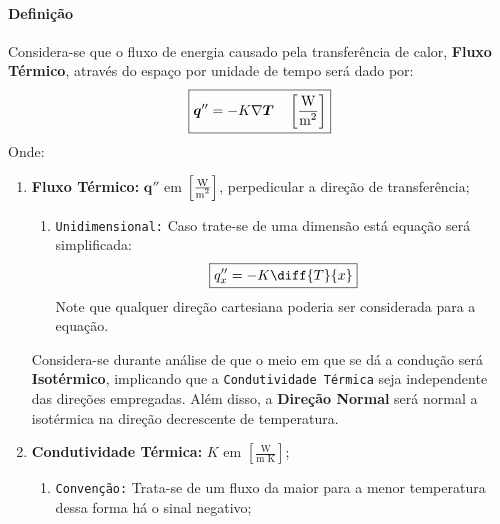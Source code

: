 \documentclass{article}
\begin{document}
            \paragraph{Definição}Considera-se que o fluxo de energia causado pela transferência de calor, \textbf{Fluxo Térmico}, através do espaço por unidade de tempo será dado por:
                \begin{equation}
                    \boxed{
                        \boldsymbol{q}'' = - K \nabla \boldsymbol{T} 
                        \quad 
                        \left[\frac{\text{W}}{\text{m\textsuperscript{2}}}\right]
                    }\label{eq.Fourier}
                \end{equation}
            Onde:
                \begin{enumerate}[rightmargin = \leftmargin]
                    \item \textbf{Fluxo Térmico:} $\boldsymbol{q}''$ em $\left[\frac{\text{W}}{\text{m\textsuperscript{2}}}\right]$, perpedicular a direção de transferência;
                        \begin{enumerate}[noitemsep]
                            \item \texttt{Unidimensional:} Caso trate-se de uma dimensão está equação será simplificada:
                                \begin{equation*}
                                    \boxed{
                                        q_{x}'' = - K \diff{T}{x}
                                    }
                                \end{equation*}
                            Note que qualquer direção cartesiana poderia ser considerada para a equação.
                        \end{enumerate}
                    Considera-se durante análise de que o meio em que se dá a condução será \textbf{Isotérmico}, implicando que a \texttt{Condutividade Térmica} seja independente das direções empregadas. Além disso, a \textbf{Direção Normal} será normal a isotérmica na direção decrescente de temperatura.

                    \item \textbf{Condutividade Térmica:} $K$ em $\left[\frac{\text{W}}{\text{m K}}\right]$;
                        \begin{enumerate}[noitemsep, rightmargin = \leftmargin]
                            \item \texttt{Convenção:} Trata-se de um fluxo da maior para a menor temperatura dessa forma há o sinal negativo;
                        \end{enumerate}


\end{enumerate}
\end{document}
